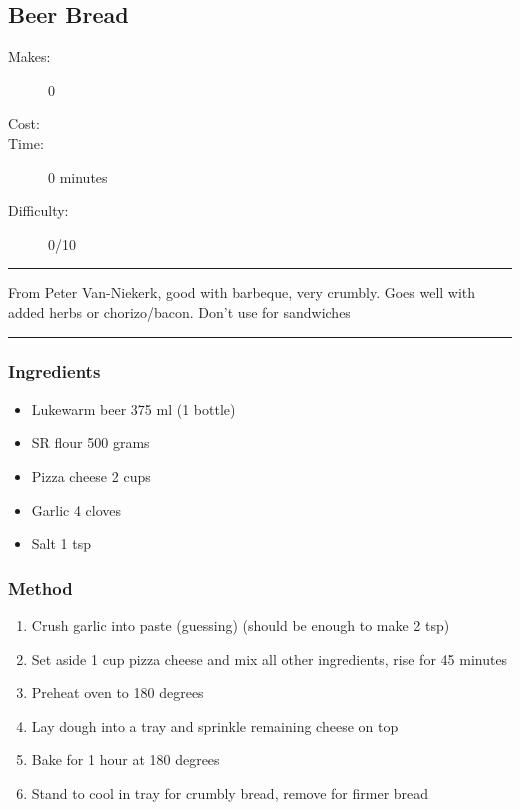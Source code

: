 \documentclass[]{article}
\begin{document}
\subsection*{\center\huge Beer Bread}
\begin{description}
\item[Makes:] 0 
\item[Cost:] \textdollar
\item[Time:] 0 minutes
\item[Difficulty:] 0/10
\end{description}
\vspace{0.2cm}\hrule\vspace{0.5cm}
\begin{adjustwidth}{0.5 cm}{0.5 cm}

From Peter Van-Niekerk, good with barbeque, very crumbly. Goes well with added herbs or chorizo/bacon. Don't use for sandwiches \hfill\color{accent}{\Large\faVimeoSquare\hspace{0.1cm}}\color{black}

\end{adjustwidth}
\vspace{0.5cm}\hrule
\subsubsection*{\Large Ingredients}
\begin{multicols}{2}
\begin{itemize}
 \item Lukewarm beer \hfill 375 ml (1 bottle)
 \item SR flour \hfill 500 grams
 \item Pizza cheese \hfill 2 cups
 \item Garlic \hfill 4 cloves
 \item Salt \hfill 1 tsp
\end{itemize}
\end{multicols}
\subsubsection*{\Large Method}
\begin{enumerate}[font=\huge\color{accent}]
	\item Crush garlic into paste (guessing) (should be enough to make 2 tsp)
	\item Set aside 1 cup pizza cheese and mix all other ingredients, rise for 45 minutes
	\item Preheat oven to 180 degrees
	\item Lay dough into a tray and sprinkle remaining cheese on top
	\item Bake for 1 hour at 180 degrees
	\item Stand to cool in tray for crumbly bread, remove for firmer bread
\end{enumerate}
\newpage
{}\label{rec:Flatbread (Milk)}
\end{document}

